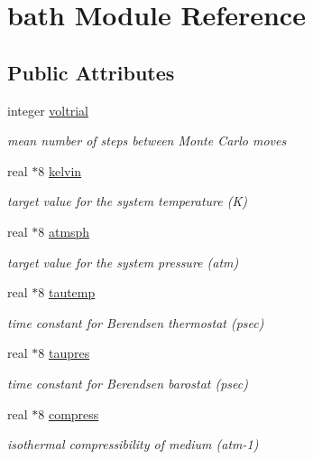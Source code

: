 \hypertarget{classbath}{\section{bath Module Reference}
\label{classbath}
}
\subsection*{Public Attributes}
\begin{DoxyCompactItemize}
\item 
integer \hyperlink{classbath_af2527ee0ddc6dbab83c329ff48a28b49}{voltrial}
\begin{DoxyCompactList}\small\item\em mean number of steps between Monte Carlo moves \end{DoxyCompactList}\item 
real $\ast$8 \hyperlink{classbath_ac7ba8921357427e956ddb761956aeee6}{kelvin}
\begin{DoxyCompactList}\small\item\em target value for the system temperature (K) \end{DoxyCompactList}\item 
real $\ast$8 \hyperlink{classbath_af51ab3bffc1008a8d519372e3a3b29f0}{atmsph}
\begin{DoxyCompactList}\small\item\em target value for the system pressure (atm) \end{DoxyCompactList}\item 
real $\ast$8 \hyperlink{classbath_a2c37bd76a8c3687874959925eb5b73ef}{tautemp}
\begin{DoxyCompactList}\small\item\em time constant for Berendsen thermostat (psec) \end{DoxyCompactList}\item 
real $\ast$8 \hyperlink{classbath_a4d9c5934953a1047212e5280cf4135d3}{taupres}
\begin{DoxyCompactList}\small\item\em time constant for Berendsen barostat (psec) \end{DoxyCompactList}\item 
real $\ast$8 \hyperlink{classbath_a97576d3970570db82ab1f8c50aaff73f}{compress}
\begin{DoxyCompactList}\small\item\em isothermal compressibility of medium (atm-\/1) \end{DoxyCompactList}\item 

\end{DoxyCompactItemize}
